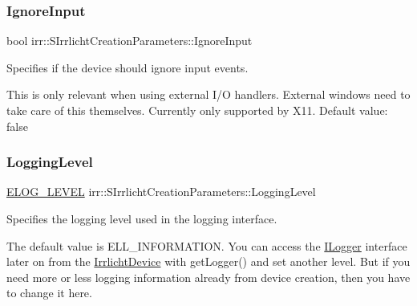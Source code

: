 \subsubsection{\texorpdfstring{Ignore\+Input}{IgnoreInput}}
{\footnotesize\ttfamily bool irr\+::\+S\+Irrlicht\+Creation\+Parameters\+::\+Ignore\+Input}



Specifies if the device should ignore input events. 

This is only relevant when using external I/O handlers. External windows need to take care of this themselves. Currently only supported by X11. Default value\+: false \mbox{\label{structirr_1_1SIrrlichtCreationParameters_a2aa305ffabdd842084ddef5014b3e411}} 
\subsubsection{\texorpdfstring{Logging\+Level}{LoggingLevel}}
{\footnotesize\ttfamily \hyperlink{namespaceirr_aa2d1cac68606a25ed24cfffccfa30a92}{E\+L\+O\+G\+\_\+\+L\+E\+V\+EL} irr\+::\+S\+Irrlicht\+Creation\+Parameters\+::\+Logging\+Level}



Specifies the logging level used in the logging interface. 

The default value is E\+L\+L\+\_\+\+I\+N\+F\+O\+R\+M\+A\+T\+I\+ON. You can access the \hyperlink{classirr_1_1ILogger}{I\+Logger} interface later on from the \hyperlink{classirr_1_1IrrlichtDevice}{Irrlicht\+Device} with get\+Logger() and set another level. But if you need more or less logging information already from device creation, then you have to change it here. \mbox{\label{structirr_1_1SIrrlichtCreationParameters_af1810ed8c5451fabb15722b6971faa3f}} 
